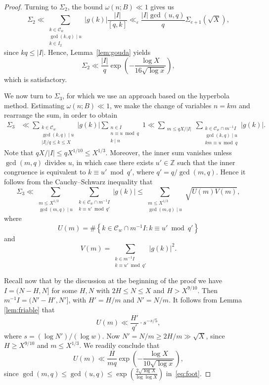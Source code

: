 \documentclass[11pt,letterpaper]{amsart}
\renewcommand{\leq}{\leqslant}
\renewcommand{\geq}{\geqslant}
\theoremstyle{definition}
\numberwithin{equation}{section}
\newcommand\ZZ{\mathbb{Z}}
\newcommand{\ve}{\varepsilon}
\DeclareMathOperator{\n}{N}
\newcommand{\0}{\mathbf{0}}
\begin{document}
\begin{proof}
Turning to $\Sigma_2$, the bound $\omega(n;B)\ll 1$ gives us 
$$
\Sigma_2\ll 
\sum_{\substack{k\in \mathcal{C}_w\\ \gcd(k,q)\mid u\\ k\in I_2}} |g(k)| 
\frac{|I|}{[q,k]}\ll_\ve \frac{|I|\gcd(u,q)}{q} \Sigma_{e+1}(\sqrt{X}),
$$
since $kq\leq |I|$.
Hence, Lemma~\ref{lem:gouda} yields
$$
\Sigma_2\ll 
\frac{|I|}{q}
\exp\left(-\frac{\log X}{16\sqrt{\log x}} \right),
$$
which is satisfactory. 

We now turn to $\Sigma_3$, for which we use an approach based on the hyperbola method. 
Estimating $\omega(n;B)\ll 1$,  we 
make the change of variables $n=km$ and rearrange the sum, in order to obtain
\begin{align*}
\Sigma_3
&\ll \sum_{\substack{k\in \mathcal{C}_w\\ \gcd(k,q)\mid u\\ |I|/q\leq k\leq X}} |g(k)|
\sum_{\substack{n\in I\\n\equiv u\bmod q\\ k\mid n}}1 \ll 
\sum_{\substack{m\leq qX/|I|}}
\sum_{\substack{k\in \mathcal{C}_w\cap m^{-1}I\\ \gcd(k,q)\mid u\\ 
km\equiv u\bmod{q}
}} |g(k)|.
\end{align*}
Note that $qX/|I|\leq q X^{1/10}\leq X^{1/3}$. Moreover, 
the inner sum vanishes unless $\gcd(m,q)$ divides $u$, in which case there 
exists $u'\in \ZZ$ such that the inner congruence is equivalent to $k\equiv u'\bmod{q'}$, where 
$q'=q/\gcd(m,q)$.
Hence it follows from the Cauchy--Schwarz inequality that 
\begin{equation}\label{eq:foot}
\Sigma_3
\ll
\sum_{\substack{m\leq X^{1/3}\\ \gcd(m,q)\mid u }}
\sum_{\substack{k\in \mathcal{C}_w\cap m^{-1}I\\ 
k\equiv u'\bmod{q'}
}} |g(k)|
\leq 
\sum_{\substack{m\leq X^{1/3}\\ \gcd(m,q)\mid u }}
\sqrt{U(m)V(m)},
\end{equation}
where
$$
U(m)=\#\left\{k\in \mathcal{C}_w\cap m^{-1}I: 
k\equiv u'\bmod{q'}\right\}
$$
and
$$
V(m)=
\sum_{\substack{k\in m^{-1}I\\ 
k\equiv u'\bmod{q'}
}} |g(k)|^2.
$$

Recall now that by the discussion at the beginning of the proof we have $I= (N-H,N]$ for some $H,N$ with $2H\leq N\leq X$ and $H>X^{9/10}$. Then 
 $m^{-1}I=(N'-H',N']$, with $H'=H/m$ and $N'=N/m$. 
 It  follows from Lemma 
\ref{lem:friable} that 
$$
U(m)\ll \frac{H'}{q'} \cdot {s}^{-s/5}, 
$$
where $s=(\log N')/(\log w)$. Now $N'=N/m\geq 2H/m\gg \sqrt{X}$, since $H\geq X^{9/10}$ and $m\leq X^{1/3}$.
 We readily conclude that 
\begin{equation}\label{eq:ankle}
U(m)\ll \frac{H }{mq} \exp\left(-\frac{\log X}{10\sqrt{\log x}}\right),
\end{equation}
since $\gcd(m,q)\leq \gcd(u,q)\leq  \exp(\frac{2\sqrt{\log X}}{\log\log X})$ in~\eqref{eq:foot}.


\end{proof}
\end{document}
